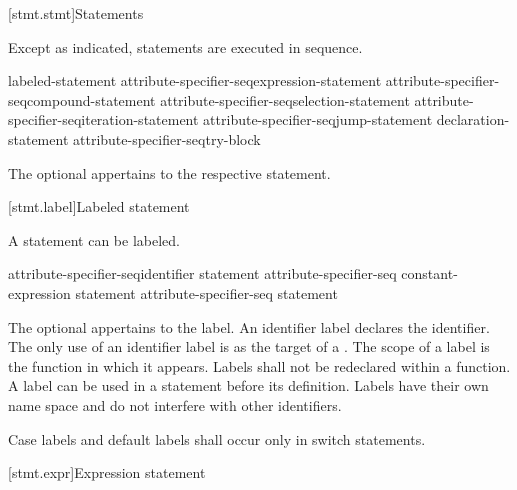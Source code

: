 [stmt.stmt]{Statements}%



\pnum
Except as indicated, statements are executed in sequence.

\begin{bnf}
\br
    labeled-statement\br
    attribute-specifier-seq\opt expression-statement\br
    attribute-specifier-seq\opt compound-statement\br
    attribute-specifier-seq\opt selection-statement\br
    attribute-specifier-seq\opt iteration-statement\br
    attribute-specifier-seq\opt jump-statement\br
    declaration-statement\br
    attribute-specifier-seq\opt try-block
\end{bnf}

The optional  appertains to the respective statement.

[stmt.label]{Labeled statement}%

\pnum
{}%
%
A statement can be labeled.

\begin{bnf}
\br
    attribute-specifier-seq\opt identifier \terminal{:} statement\br
    attribute-specifier-seq\opt {} constant-expression \terminal{:} statement\br
    attribute-specifier-seq\opt {} statement
\end{bnf}

The optional  appertains to the label. An identifier label declares the identifier. The only use of an
identifier label is as the target of a
%
.
%
The scope of a label is the function in which it appears. Labels shall
not be redeclared within a function. A label can be used in a
 statement before its definition.
%
Labels have their own name space and do not interfere with other
identifiers.

\pnum
{}%
%
Case labels and default labels shall occur only in switch statements.


[stmt.expr]{Expression statement}%


